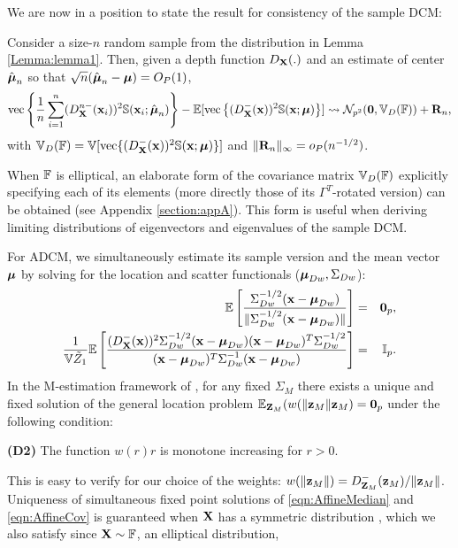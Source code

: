 \noindent We are now in a position to state the result for consistency of the sample DCM:

\begin{Theorem} \label{Theorem:rootn}
Consider a size-$n$ random sample from the distribution in Lemma \ref{Lemma:lemma1}. Then, given a depth function $D_{\mathbf{X}}(.)$ and an estimate of center $\hat{{\boldsymbol{\mu}}}_n$ so that $\sqrt n(\hat {{\boldsymbol{\mu}}}_n - {\boldsymbol{\mu}}) = O_P(1)$,
%
$$ \operatorname*{vec} \left\{ \frac{1}{n} \sum_{i=1}^n (D^{n-}_{\mathbf{X}} ({\bf{x}}_i))^2 {\mathbb{S}}({\bf{x}}_i; \hat{{\boldsymbol{\mu}}}_n) \right\} -
{\mathbb{E}} [ \operatorname*{vec} \left\{ (D^-_{\mathbf{X}} ({\bf{x}}))^2 {\mathbb{S}}({\bf{x}}; {\boldsymbol{\mu}}) \right\} ] \rightsquigarrow
\mathcal{N}_{p^2} ({\bf 0}, {\mathbb{V}}_D({\mathbb{F}})) + {\mathbf{R}}_n,
$$
%
with ${\mathbb{V}}_D({\mathbb{F}}) = {\mathbb{V}} [\operatorname*{vec} \{ (D^-_{\mathbf{X}} ({\bf{x}}))^2 {\mathbb{S}}({\bf{x}}; {\boldsymbol{\mu}}) \} ] $ and $\| {\mathbf{R}}_n \|_\infty = o_P(n^{-1/2})$.
\end{Theorem}

\noindent When ${\mathbb{F}}$ is elliptical, an elaborate form of the covariance matrix ${\mathbb{V}}_D({\mathbb{F}})$ explicitly specifying each of its elements (more directly those of its $\Gamma^T$-rotated version) can be obtained (see Appendix \ref{section:appA}). This form is useful when deriving limiting distributions of eigenvectors and eigenvalues of the sample DCM.

For ADCM, we simultaneously estimate its sample version and the mean vector ${\boldsymbol{\mu}}$ by solving for the location and scatter functionals (${\boldsymbol{\mu}}_{Dw}, \Sigma_{Dw}$):
%
\begin{eqnarray}
{\mathbb{E}} \left[ \frac{\Sigma_{Dw}^{-1/2} ({\bf{x}} - {\boldsymbol{\mu}}_{Dw})}{ \| \Sigma_{Dw}^{-1/2}({\bf{x}} - {\boldsymbol{\mu}}_{Dw}) \|} \right] &=& {\bf 0}_p, \label{eqn:AffineMedian}\\
\frac{1}{{\mathbb{V}} \tilde Z_1}
{\mathbb{E}} \left[ \frac{(D^-_{\mathbf{X}}({\bf{x}}))^2 \Sigma_{Dw}^{-1/2} ({\bf{x}} - {\boldsymbol{\mu}}_{Dw}) ({\bf{x}} - {\boldsymbol{\mu}}_{Dw})^T \Sigma_{Dw}^{-1/2}}{({\bf{x}} - {\boldsymbol{\mu}}_{Dw})^T \Sigma_{Dw}^{-1} ({\bf{x}} - {\boldsymbol{\mu}}_{Dw})} \right] &=& {\mathbb{I}}_p. \label{eqn:AffineCov}
\end{eqnarray}
%
In the M-estimation framework of \cite{HuberBook81}, for any fixed $\Sigma_M$ there exists a unique and fixed solution of the general location problem ${\mathbb{E}}_{{\mathbf{Z}}_M} (w(\| {\bf{z}}_M \| {\bf{z}}_M) = {\bf 0}_p $ under the following condition:

\vspace{1em}
\noindent\textbf{(D2)} The function $w(r)r$ is monotone increasing for $r>0$.

\vspace{1em}
\noindent This is easy to verify for our choice of the weights: $w(\| {\bf{z}}_M \| ) = D^-_{{\mathbf{Z}}_M} ({\bf{z}}_M) / \| {\bf{z}}_M \|$. Uniqueness of simultaneous fixed point solutions of \eqref{eqn:AffineMedian} and \eqref{eqn:AffineCov} is guaranteed when ${\mathbf{X}}$ has a symmetric distribution \citep{HuberBook81}, which we also satisfy since ${\mathbf{X}} \sim {\mathbb{F}}$, an elliptical distribution,

